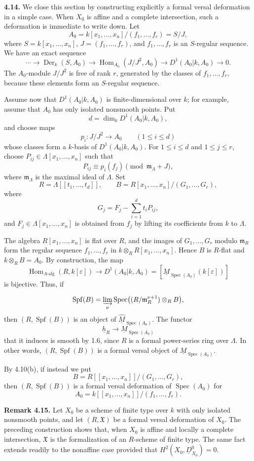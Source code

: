 \medskip
\noindent\textbf{4.14.}
We close this section by constructing explicitly a formal versal
deformation in a simple case. When $X_0$ is affine and a complete
intersection, such a deformation is immediate to write down. Let
\[
A_0=k[x_1,\ldots,x_n]/(f_1,\ldots,f_r)=S/J,
\]
where $S=k[x_1,\ldots,x_n]$, $J=(f_1,\ldots,f_r)$, and
$f_1,\ldots,f_r$ is an $S$-regular sequence. We have an exact
sequence
\[
\cdots\longrightarrow\operatorname{Der}_k(S,A_0)
\longrightarrow\operatorname{Hom}_{A_0}(J/J^2,A_0)
\longrightarrow D^1(A_0|k,A_0)\longrightarrow0.
\]
The $A_0$-module $J/J^2$ is free of rank $r$, generated by the
classes of $f_1,\ldots,f_r$, because these elements form an
$S$-regular sequence.

Assume now that $D^1(A_0|k,A_0)$ is finite-dimensional over $k$;
for example, assume that $A_0$ has only isolated nonsmooth points.
Put
\[
d=\dim_kD^1(A_0|k,A_0),
\]
and choose maps
\[
p_i:J/J^2\longrightarrow A_0\qquad(1\leq i\leq d)
\]
whose classes form a $k$-basis of $D^1(A_0|k,A_0)$. For
$1\leq i\leq d$ and $1\leq j\leq r$, choose
$P_{ij}\in\Lambda[x_1,\ldots,x_n]$ such that
\[
P_{ij}\equiv p_i(f_j)\pmod{\mathfrak m_\Lambda+J},
\]
where $\mathfrak m_\Lambda$ is the maximal ideal of $\Lambda$. Set
\[
R=\Lambda[[t_1,\ldots,t_d]],
\qquad
B=R[x_1,\ldots,x_n]/(G_1,\ldots,G_r),
\]
where
\[
G_j=F_j-\sum_{i=1}^d t_iP_{ij},
\]
and $F_j\in\Lambda[x_1,\ldots,x_n]$ is obtained from $f_j$ by
lifting its coefficients from $k$ to $\Lambda$.

The algebra $R[x_1,\ldots,x_n]$ is flat over $R$, and the images of
$G_1,\ldots,G_r$ modulo $\mathfrak m_R$ form the regular sequence
$f_1,\ldots,f_r$ in
$k\otimes_RR[x_1,\ldots,x_n]$. Hence $B$ is $R$-flat and
$k\otimes_RB=A_0$. By construction, the map
\[
\operatorname{Hom}_{\Lambda\text{-alg}}(R,k[\varepsilon])
\longrightarrow D^1(A_0|k,A_0)
=[\underline M_{\operatorname{Spec}(A_0)}(k[\varepsilon])]
\]
is bijective. Thus, if


\[
\operatorname{Spf}(B)
=\varinjlim_\nu
\operatorname{Spec}\bigl((R/\mathfrak m_R^{\nu+1})\otimes_RB\bigr),
\]
then $(R,\operatorname{Spf}(B))$ is an object of
$\widehat{\underline M}_{\operatorname{Spec}(A_0)}$. The functor
\[
\underline h_R\longrightarrow\underline M_{\operatorname{Spec}(A_0)}
\]
that it induces is smooth by 1.6, since $R$ is a formal power-series
ring over $\Lambda$. In other words,
$(R,\operatorname{Spf}(B))$ is a formal versal object of
$\underline M_{\operatorname{Spec}(A_0)}$.

By 4.10(b), if instead we put
\[
B=R[[x_1,\ldots,x_n]]/(G_1,\ldots,G_r),
\]
then $(R,\operatorname{Spf}(B))$ is a formal versal deformation of
$\operatorname{Spec}(A_0)$ for
\[
A_0=k[[x_1,\ldots,x_n]]/(f_1,\ldots,f_r).
\]

\medskip
\noindent\textbf{Remark 4.15.}
Let $X_0$ be a scheme of finite type over $k$ with only isolated
nonsmooth points, and let $(R,\mathfrak X)$ be a formal versal
deformation of $X_0$. The preceding construction shows that, when
$X_0$ is affine and locally a complete intersection, $\mathfrak X$
is the formalization of an $R$-scheme of finite type. The same fact
extends readily to the nonaffine case provided that
$H^2(X_0,\underline D^0_{X_0})=0$.

